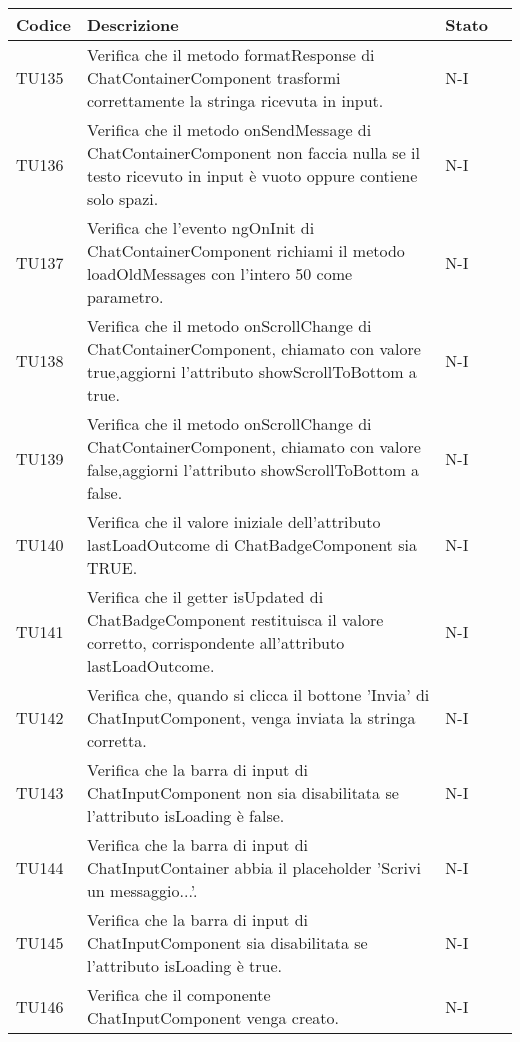 \begin{table}[h!]
    \centering
    \renewcommand{\arraystretch}{1.5}
    \begin{tabularx}{\textwidth}{|p{}|X|p{}|p{}|}\hline
    \rowcolor[HTML]{FFD700}
    \textbf{Codice} & \textbf{Descrizione} & \textbf{Stato} \\ \hline

    TU135 & Verifica che il metodo formatResponse di ChatContainerComponent trasformi correttamente la stringa ricevuta in input. &  N-I \\ \hline
    TU136 & Verifica che il metodo onSendMessage di ChatContainerComponent non faccia nulla se il testo ricevuto in input è vuoto oppure contiene solo spazi. &  N-I \\ \hline
    TU137 & Verifica che l'evento ngOnInit di ChatContainerComponent richiami il metodo loadOldMessages con l'intero 50 come parametro. &  N-I \\ \hline
    TU138 & Verifica che il metodo onScrollChange di ChatContainerComponent, chiamato con valore true,aggiorni l'attributo showScrollToBottom a true. &  N-I \\ \hline
    TU139 & Verifica che il metodo onScrollChange di ChatContainerComponent, chiamato con valore false,aggiorni l'attributo showScrollToBottom a false. &  N-I \\ \hline
    TU140 & Verifica che il valore iniziale dell'attributo lastLoadOutcome di ChatBadgeComponent sia TRUE. &  N-I \\ \hline
    TU141 & Verifica che il getter isUpdated di ChatBadgeComponent restituisca il valore corretto, corrispondente all'attributo lastLoadOutcome. &  N-I \\ \hline
    TU142 & Verifica che, quando si clicca il bottone 'Invia' di ChatInputComponent, venga inviata la stringa corretta. &  N-I \\ \hline
    TU143 & Verifica che la barra di input di ChatInputComponent non sia disabilitata se l'attributo isLoading è false. &  N-I \\ \hline
    TU144 & Verifica che la barra di input di ChatInputContainer abbia il placeholder 'Scrivi un messaggio...'. &  N-I \\ \hline
    TU145 & Verifica che la barra di input di ChatInputComponent sia disabilitata se l'attributo isLoading è true. &  N-I \\ \hline
    TU146 & Verifica che il componente ChatInputComponent venga creato. &  N-I \\ \hline

\end{tabularx}
\end{table}
